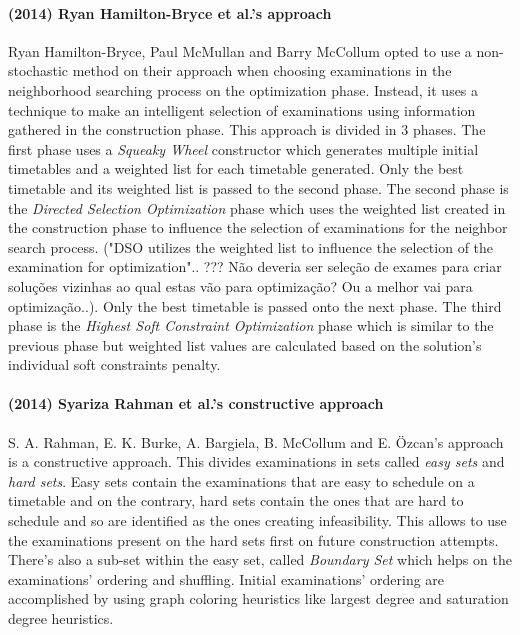\paragraph{(2014) Ryan Hamilton-Bryce et al.'s approach}
Ryan Hamilton-Bryce, Paul McMullan and Barry McCollum opted to use a non-stochastic method on their approach \cite{Hamilton-Bryce2014} when choosing examinations in the neighborhood searching process on the optimization phase. Instead, it uses a technique to make an intelligent selection of examinations using information gathered in the construction phase. This approach is divided in 3 phases. The first phase uses a \textit{Squeaky Wheel} constructor which generates multiple initial timetables and a weighted list for each timetable generated. Only the best timetable and its weighted list is passed to the second phase. The second phase is the \textit{Directed Selection Optimization} phase which uses the weighted list created in the construction phase to influence the selection of examinations for the neighbor search process. {\color{red} ("DSO utilizes the weighted list to influence the selection of the examination for optimization".. ??? Não deveria ser seleção de exames para criar soluções vizinhas ao qual estas vão para optimização? Ou a melhor vai para optimização..)}. Only the best timetable is passed onto the next phase. The third phase is the \textit{Highest Soft Constraint Optimization} phase which is similar to the previous phase but weighted list values are calculated based on the solution's individual soft constraints penalty.\\

\paragraph{(2014) Syariza Rahman et al.'s constructive approach}
S. A. Rahman, E. K. Burke, A. Bargiela, B. McCollum and E. Özcan's approach \cite{Rahman2014} is a constructive approach. This divides examinations in sets called \textit{easy sets} and \textit{hard sets}. Easy sets contain the examinations that are easy to schedule on a timetable and on the contrary, hard sets contain the ones that are hard to schedule and so are identified as the ones creating infeasibility. This allows to use the examinations present on the hard sets first on future construction attempts. There's also a sub-set within the easy set, called \textit{Boundary Set} which helps on the examinations' ordering and shuffling. Initial examinations' ordering  are accomplished by using graph coloring heuristics like largest degree and saturation degree heuristics.\\

